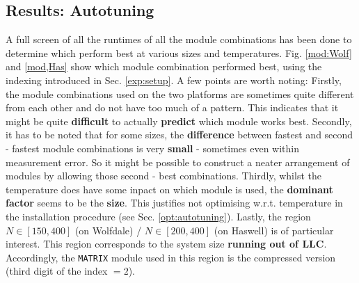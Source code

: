\documentclass[letterpaper]{article}
\begin{document}
\subsection{Results: Autotuning}
A full screen of all the runtimes of all the module combinations has been done to determine which perform best at various sizes and temperatures. 
\newline Fig. \ref{mod:Wolf} and \ref{mod,Has} show which module combination performed best, using the indexing introduced in Sec. \ref{exp:setup}. A few points are worth noting: \newline
Firstly, the module combinations used on the two platforms are sometimes quite different from each other and do not have too much of a pattern. This indicates that it might be quite \textbf{difficult} to actually \textbf{predict} which module works best. \newline
Secondly, it has to be noted that for some sizes, the \textbf{difference} between fastest and second - fastest module combinations is very \textbf{small} - sometimes even within measurement error. So it might be possible to construct a neater arrangement of modules by allowing those second - best combinations.\newline
Thirdly, whilst the temperature does have some inpact on which module is used, the \textbf{dominant factor} seems to be the \textbf{size}. This justifies not optimising w.r.t. temperature in the installation procedure (see Sec. \ref{opt:autotuning}).\newline
Lastly, the region $N \in [150,400]$ (on Wolfdale) / $N \in [200,400]$ (on Haswell) is of particular interest. This region corresponds to the system size \textbf{running out of LLC}. Accordingly, the \texttt{MATRIX} module used in this region is the compressed version (third digit of the index $=2$).
\end{document}
